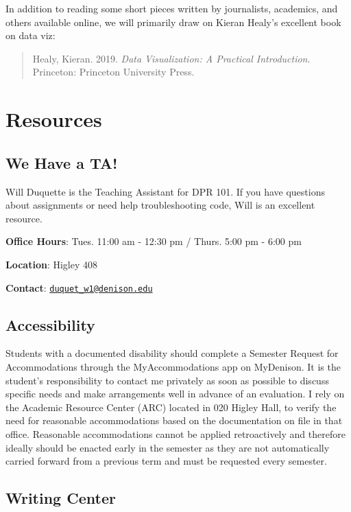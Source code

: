 \documentclass[11pt,]{article}
\begin{document}
In addition to reading some short pieces written by journalists,
academics, and others available online, we will primarily draw on Kieran
Healy's excellent book on data viz:

\begin{quote}
Healy, Kieran. 2019. \emph{Data Visualization: A Practical
Introduction}. Princeton: Princeton University Press.
\end{quote}

\hypertarget{resources}{%
\section{Resources}\label{resources}}

\hypertarget{we-have-a-ta}{%
\subsection{We Have a TA!}\label{we-have-a-ta}}

Will Duquette is the Teaching Assistant for DPR 101. If you have
questions about assignments or need help troubleshooting code, Will is
an excellent resource.

\textbf{Office Hours}: Tues. 11:00 am - 12:30 pm / Thurs. 5:00 pm - 6:00
pm

\textbf{Location}: Higley 408

\textbf{Contact}:
\href{mailto:duquet_w1@denison.edu}{\nolinkurl{duquet\_w1@denison.edu}}

\hypertarget{accessibility}{%
\subsection{Accessibility}\label{accessibility}}

Students with a documented disability should complete a Semester Request
for Accommodations through the MyAccommodations app on MyDenison. It is
the student's responsibility to contact me privately as soon as possible
to discuss specific needs and make arrangements well in advance of an
evaluation. I rely on the Academic Resource Center (ARC) located in 020
Higley Hall, to verify the need for reasonable accommodations based on
the documentation on file in that office. Reasonable accommodations
cannot be applied retroactively and therefore ideally should be enacted
early in the semester as they are not automatically carried forward from
a previous term and must be requested every semester.

\hypertarget{writing-center}{%
\subsection{Writing Center}\label{writing-center}}
\end{document}

